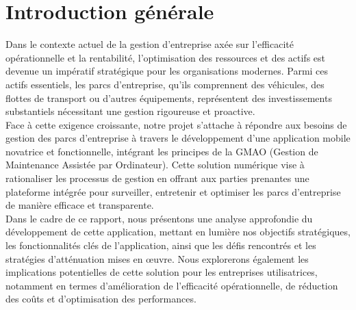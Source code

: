 \chapter*{Introduction générale} 


Dans le contexte actuel de la gestion d'entreprise axée sur l'efficacité opérationnelle et la rentabilité, l'optimisation des ressources et des actifs est devenue un impératif stratégique pour les organisations modernes. Parmi ces actifs essentiels, les parcs d'entreprise, qu'ils comprennent des véhicules, des flottes de transport ou d'autres équipements, représentent des investissements substantiels nécessitant une gestion rigoureuse et proactive.\\

Face à cette exigence croissante, notre projet s'attache à répondre aux besoins de gestion des parcs d'entreprise à travers le développement d'une application mobile novatrice et fonctionnelle, intégrant les principes de la GMAO (Gestion de Maintenance Assistée par Ordinateur). Cette solution numérique vise à rationaliser les processus de gestion en offrant aux parties prenantes une plateforme intégrée pour surveiller, entretenir et optimiser les parcs d'entreprise de manière efficace et transparente.\\

Dans le cadre de ce rapport, nous présentons une analyse approfondie du développement de cette application, mettant en lumière nos objectifs stratégiques, les fonctionnalités clés de l'application, ainsi que les défis rencontrés et les stratégies d'atténuation mises en œuvre. Nous explorerons également les implications potentielles de cette solution pour les entreprises utilisatrices, notamment en termes d'amélioration de l'efficacité opérationnelle, de réduction des coûts et d'optimisation des performances.